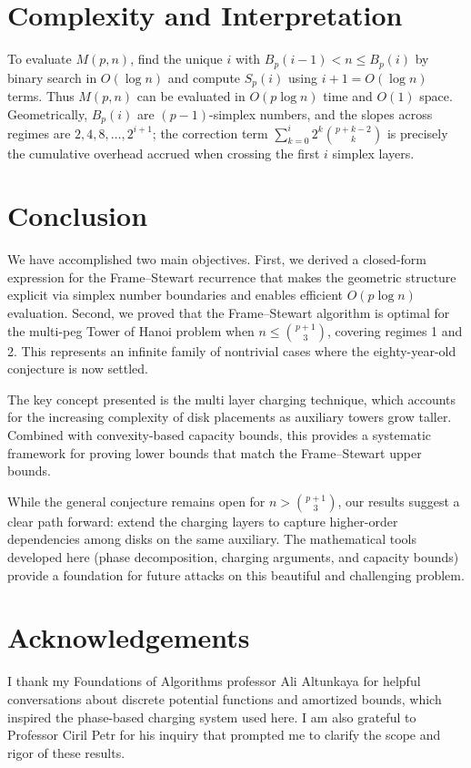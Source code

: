 \documentclass[11pt]{article}
\theoremstyle{definition}
\begin{document}
\section{Complexity and Interpretation}

To evaluate $M(p,n)$, find the unique $i$ with $B_p(i-1) < n \leq B_p(i)$ by binary search in $O(\log n)$ and compute $S_p(i)$ using $i+1 = O(\log n)$ terms. Thus $M(p,n)$ can be evaluated in $O(p \log n)$ time and $O(1)$ space. Geometrically, $B_p(i)$ are $(p-1)$-simplex numbers, and the slopes across regimes are $2, 4, 8, \dots, 2^{i+1}$; the correction term $\sum_{k=0}^i 2^k \binom{p+k-2}{k}$ is precisely the cumulative overhead accrued when crossing the first $i$ simplex layers.

\section{Conclusion}

We have accomplished two main objectives. First, we derived a closed-form expression for the Frame--Stewart recurrence that makes the geometric structure explicit via simplex number boundaries and enables efficient $O(p \log n)$ evaluation. Second, we proved that the Frame--Stewart algorithm is optimal for the multi-peg Tower of Hanoi problem when $n \leq \binom{p+1}{3}$, covering regimes 1 and 2. This represents an infinite family of nontrivial cases where the eighty-year-old conjecture is now settled.

The key concept presented is the multi layer charging technique, which accounts for the increasing complexity of disk placements as auxiliary towers grow taller. Combined with convexity-based capacity bounds, this provides a systematic framework for proving lower bounds that match the Frame--Stewart upper bounds.

While the general conjecture remains open for $n > \binom{p+1}{3}$, our results suggest a clear path forward: extend the charging layers to capture higher-order dependencies among disks on the same auxiliary. The mathematical tools developed here (phase decomposition, charging arguments, and capacity bounds) provide a foundation for future attacks on this beautiful and challenging problem.

\section*{Acknowledgements}

I thank my Foundations of Algorithms professor Ali Altunkaya for helpful conversations about discrete potential functions and amortized bounds, which inspired the phase-based charging system used here. I am also grateful to Professor Ciril Petr for his inquiry that prompted me to clarify the scope and rigor of these results.
\end{document}
